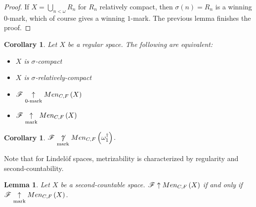 \documentclass{amsart}
\newtheorem{lemma}[theorem]{Lemma}
\newtheorem{corollary}[theorem]{Corollary}
\theoremstyle{definition}
\begin{document}
\begin{proof}
  If \(X=\bigcup_{n<\omega} R_n\) for \(R_n\) relatively compact, then
  \(\sigma(n)=R_n\) is a winning \(0\)-mark, which of course gives a
  winning \(1\)-mark. The previous lemma finishes the proof.
\end{proof}

\begin{corollary}
  Let \(X\) be a regular space. The following are equivalent:
  \begin{itemize}
    \item \(X\) is \(\sigma\)-compact
    \item \(X\) is \(\sigma\)-relatively-compact
    \item \(\mathscr{F} \underset{0\text{-mark}}{\uparrow} Men_{C,F}\left({X}\right)\)
    \item \(\mathscr{F} \underset{\text{mark}}{\uparrow} Men_{C,F}\left({X}\right)\)
  \end{itemize}
\end{corollary}

\begin{corollary}
  \(\mathscr{F}\underset{\text{mark}}{\not\uparrow}Men_{C,F}\left({\omega_1^\dagger}\right)\).
\end{corollary}

Note that for Lindel\"of spaces, metrizability is characterized by regularity
and second-countability.

\begin{lemma}
  Let \(X\) be a second-countable space. \(\mathscr{F}\uparrow Men_{C,F}\left({X}\right)\) if and only if
  \(\mathscr{F}\underset{\text{mark}}{\uparrow}Men_{C,F}\left({X}\right)\).
\end{lemma}
\end{document}
